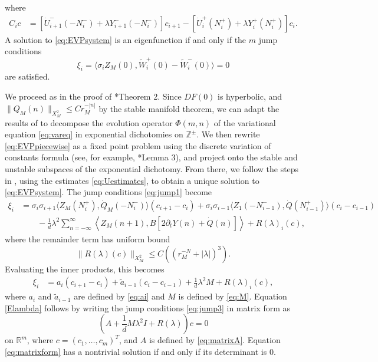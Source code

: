 \documentclass[12pt,reqno]{amsart}
\def\R{{\mathbb R}}
\def\Z{{\mathbb Z}}
\theoremstyle{definition}
\begin{document}
where
\begin{equation}
\begin{aligned}
C_i c &= [ \dot{U}_{i+1}^-(-N_i^-) + \lambda Y_{i+1}^-(-N_i^-) ]c_{i+1} 
- [ \dot{U}_i^+(N_i^+) + \lambda Y_i^+(N_i^+) ] c_i.
\end{aligned}
\end{equation}
A solution to \cref{eq:EVPsystem} is an eigenfunction if and only if the $m$ jump conditions
\begin{equation}\label{eq:jump1}
\xi_i = \langle \sigma_i Z_M(0), \tilde{W}_i^+(0) - \tilde{W}_i^-(0) \rangle = 0
\end{equation}
are satisfied.

We proceed as in the proof of \cite{Parker2020}*{Theorem 2}. Since $DF(0)$ is hyperbolic, and $\| Q_M(n) \|_{X_M^2} \leq C r_M^{-|n|}$ by the stable manifold theorem, we can adapt the results of \cite{Palmer1988} to decompose the evolution operator $\Phi(m,n)$ of the variational equation \cref{eq:vareq} in exponential dichotomies on $\Z^\pm$. We then rewrite \cref{eq:EVPpiecewise} as a fixed point problem using the discrete variation of constants formula (see, for example, \cite{Parker2020}*{Lemma 3}), and project onto the stable and unstable subspaces of the exponential dichotomy. From there, we follow the steps in \cite{Parker2020}, using the estimates \cref{eq:Uestimates}, to obtain a unique solution to \cref{eq:EVPsystem}. The jump conditions \cref{eq:jump1} become
\begin{equation}\label{eq:jump2}
\begin{aligned}
\xi_i &= \sigma_i \sigma_{i+1} \langle Z_M(N_i^+), \dot{Q}_M (-N_i^-) \rangle (c_{i+1} - c_i) 
+ \sigma_i\sigma_{i-1} \langle  Z_1(-N_{i-1}^-), \dot{Q}(N_{i-1}^+) \rangle (c_i - c_{i-1}) \\
&\qquad -\frac{1}{d} \lambda^2 \sum_{n=-\infty}^\infty \left\langle Z_M(n+1), B[ 2 \partial_t Y(n) + \dot{Q}(n)]\right\rangle + R(\lambda)_i(c),
\end{aligned}
\end{equation}
where the remainder term has uniform bound
\[
\| R(\lambda)(c)\|_{X_M^2} \leq C \left( (r_M^{-N} + |\lambda|)^3\right).
\]
Evaluating the inner products, this becomes
\begin{equation}\label{eq:jump3}
\begin{aligned}
\xi_i &= a_i (c_{i+1} - c_i) + \tilde{a}_{i-1} (c_i - c_{i-1}) + \frac{1}{d} \lambda^2 M + R(\lambda)_i(c),
\end{aligned}
\end{equation}
where $a_i$ and $\tilde{a}_{i-1}$ are defined by \cref{eq:ai} and $M$ is defined by \cref{eq:M}. Equation \cref{Elambda} follows by writing the jump conditions \cref{eq:jump3} in matrix form as
\begin{equation}\label{eq:matrixform}
\left( A + \frac{1}{d} M \lambda^2 I + R(\lambda) \right) c = 0
\end{equation}
on $\R^m$, where $c = (c_1, \dots, c_m)^T$, and $A$ is defined by \cref{eq:matrixA}. Equation \cref{eq:matrixform} has a nontrivial solution if and only if its determinant is 0.



\end{document}
